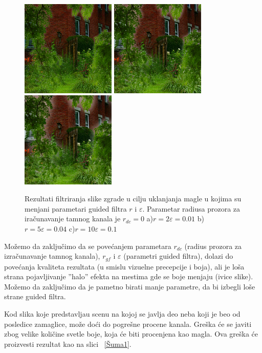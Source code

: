 \documentclass[a4paper,12pt,titlepage]{article}
\begin{document}
\begin{figure}[ht!]
\centering
\includegraphics[width=45mm]{img/hazeResGF2_01.png}
\includegraphics[width=45mm]{img/hazeResGF5_04.png}
\includegraphics[width=45mm]{img/hazeResGF10_1.png}
\caption{Rezultati filtriranja slike zgrade u cilju uklanjanja magle u kojima su menjani parametari guided filtra $r$ i $\varepsilon$. Parametar radiusa prozora  za iračunavanje tamnog kanala je $r_{dc} = 0$ a)$r = 2 \varepsilon = 0.01$ b)$r = 5 \varepsilon = 0.04$ c)$r = 10 \varepsilon = 0.1$}
\label{UticajRdc}
\end{figure} 

Možemo da zaključimo da se povećanjem parametara $r_{dc}$ (radius prozora za izračunavanje tamnog kanala), $r_{gf}$ i $\varepsilon$ (parametri guided filtra), dolazi do povećanja kvaliteta rezultata (u smislu vizuelne precepcije i boja), ali je loša strana pojavljivanje ''halo'' efekta na mestima gde se boje menjaju (ivice slike). Možemo da zaključimo da je pametno birati manje parametre, da bi izbegli loše strane guided filtra.

Kod slika koje predstavljau scenu na kojoj se javlja deo neba koji je beo od posledice zamaglice, može doći do pogrešne procene kanala. Greška će se javiti zbog velike količine svetle boje, koja će biti procenjena kao magla. Ova greška će proizvesti rezultat kao na slici ~\ref{Šuma1}.
\end{document}
